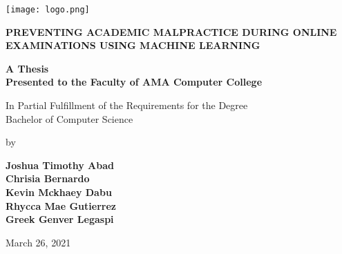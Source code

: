 \begin{titlepage}
    \begin{center}
        \vspace{6em}

        \texttt{[image: logo.png]}

        \begingroup
        \textbf{
            \uppercase{Preventing Academic Malpractice During Online Examinations using Machine Learning}
        }
        \endgroup

        \vspace{6em}

        \textbf{A Thesis\\
            Presented to the Faculty of AMA Computer College}

        \vspace{6em}

        In Partial Fulfillment of the Requirements for the Degree\\
        Bachelor of Computer Science

        \vspace{5em}

        by

        \vspace{3em}

        \textbf{
            Joshua Timothy Abad \\
            Chrisia Bernardo \\
            Kevin Mckhaey Dabu \\
            Rhycca Mae Gutierrez \\
            Greek Genver Legaspi
        }

        \vspace{2em}

        March 26, 2021

    \end{center}
\end{titlepage}
